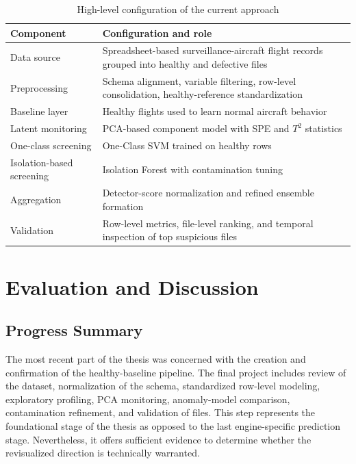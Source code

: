 \documentclass[12pt,a4paper]{report}
\begin{document}
	\begin{table}[htbp]
		\centering
		\caption{High-level configuration of the current approach}
		\label{tab:config}
		\small
		\begin{tabular}{|p{3.5cm}|p{9.3cm}|}
			\hline
			\textbf{Component} & \textbf{Configuration and role} \\
			\hline
			Data source & Spreadsheet-based surveillance-aircraft flight records grouped into healthy and defective files \\
			\hline
			Preprocessing & Schema alignment, variable filtering, row-level consolidation, healthy-reference standardization \\
			\hline
			Baseline layer & Healthy flights used to learn normal aircraft behavior \\
			\hline
			Latent monitoring & PCA-based component model with SPE and $T^2$ statistics \\
			\hline
			One-class screening & One-Class SVM trained on healthy rows \\
			\hline
			Isolation-based screening & Isolation Forest with contamination tuning \\
			\hline
			Aggregation & Detector-score normalization and refined ensemble formation \\
			\hline
			Validation & Row-level metrics, file-level ranking, and temporal inspection of top suspicious files \\
			\hline
		\end{tabular}
	\end{table}
	
	\chapter{Evaluation and Discussion}
	
	\section{Progress Summary}
	
	The most recent part of the thesis was concerned with the creation and confirmation of the healthy-baseline pipeline. The final project includes review of the dataset, normalization of the schema, standardized row-level modeling, exploratory profiling, PCA monitoring, anomaly-model comparison, contamination refinement, and validation of files. This step represents the foundational stage of the thesis as opposed to the last engine-specific prediction stage. Nevertheless, it offers sufficient evidence to determine whether the revisualized direction is technically warranted.
	
\end{document}
